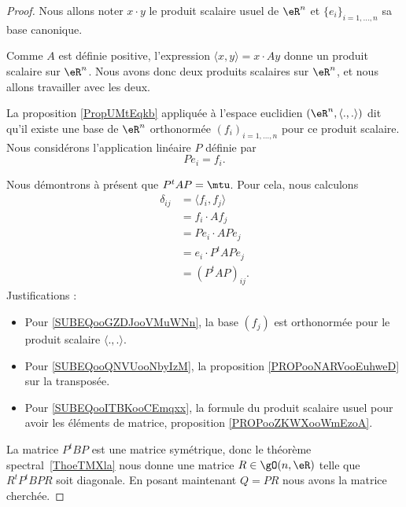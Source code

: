 \begin{proof}
	Nous allons noter \( x\cdot y\) le produit scalaire usuel de \( \eR^n\) et \( \{ e_i \}_{i=1,\ldots, n}\) sa base canonique.

	Comme \( A\) est définie positive, l'expression \( \langle x, y\rangle =x\cdot Ay\) donne un produit scalaire sur \( \eR^n\). Nous avons donc deux produits scalaires sur \( \eR^n\), et nous allons travailler avec les deux.

	La proposition \ref{PropUMtEqkb} appliquée à l'espace euclidien \( (\eR^n,\langle ., .\rangle )\) dit qu'il existe une base de \( \eR^n\) orthonormée \( (f_i )_{i=1,\ldots, n}\) pour ce produit scalaire. Nous considérons l'application linéaire \( P\) définie par
	\begin{equation}
		Pe_i=f_i.
	\end{equation}

	Nous démontrons à présent que \( P^tAP=\mtu\). Pour cela, nous calculons
	\begin{subequations}
		\begin{align}
			\delta_{ij} & =\langle f_i, f_j\rangle    \label{SUBEQooGZDJooVMuWNn} \\
			            & =f_i\cdot Af_j                                          \\
			            & =Pe_i\cdot APe_j                                        \\
			            & =e_i\cdot P^tAPe_j      \label{SUBEQooQNVUooNbyIzM}     \\
			            & =(P^tAP)_{ij}.          \label{SUBEQooITBKooCEmqxx}
		\end{align}
	\end{subequations}
	Justifications :
	\begin{itemize}
		\item Pour \eqref{SUBEQooGZDJooVMuWNn}, la base \( (f_j)\) est orthonormée pour le produit scalaire \( \langle ., .\rangle \).
		\item Pour \eqref{SUBEQooQNVUooNbyIzM}, la proposition \ref{PROPooNARVooEuhweD} sur la transposée.
		\item Pour \eqref{SUBEQooITBKooCEmqxx}, la formule du produit scalaire usuel pour avoir les éléments de matrice, proposition \ref{PROPooZKWXooWmEzoA}.
	\end{itemize}
	La matrice \( P^tBP\) est une matrice symétrique, donc le théorème spectral~\ref{ThoeTMXla} nous donne une matrice \( R\in \gO(n,\eR)\) telle que \( R^tP^tBPR\) soit diagonale. En posant maintenant \( Q=PR\) nous avons la matrice cherchée.
\end{proof}

